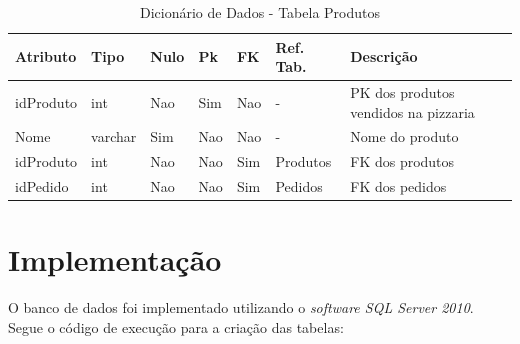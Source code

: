 \documentclass[
	12pt,				%
	openright,			%
	oneside,			%
	a4paper,			%
	chapter=TITLE,		%
	section=TITLE,		%
	english,			%
	brazil				%
	]{abntex2}
\begin{document}
    \begin{table}[htbp]
        \caption{Dicionário de Dados - Tabela Produtos}
        \label{tb1_dicionario_dados_produtos}
        \begin{tabular}{|l|l|l|l|l|l|p{3cm}|}
        \hline
            \textbf{Atributo} & 
            \textbf{Tipo} & 
            \textbf{Nulo} & 
            \textbf{Pk} & 
            \textbf{FK} & 
            \textbf{Ref. Tab.} & 
            \textbf{Descrição} \\ \hline
            idProduto & int & Nao & Sim & Nao & - & PK dos produtos vendidos na pizzaria \\ \hline
            Nome & varchar & Sim & Nao & Nao & - & Nome do produto \\ \hline
            idProduto & int & Nao & Nao & Sim & Produtos & FK dos produtos \\ \hline
            idPedido & int & Nao & Nao & Sim & Pedidos & FK dos pedidos \\ \hline
        \end{tabular}
    \end{table}
    
\chapter{Implementação}
    O banco de dados foi implementado utilizando o \textit{software SQL Server 2010}. Segue o código de execução para a criação das tabelas:
    
\end{document}
